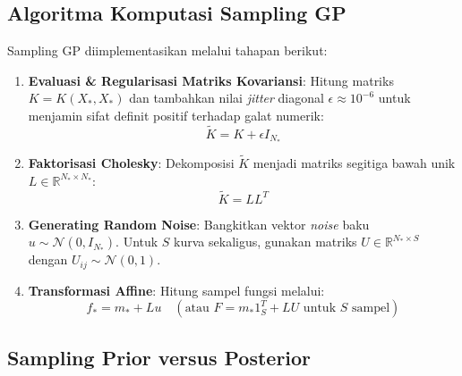 \documentclass[11pt,a4paper]{article}
\def\mathbf#1{#1}%
\begin{document}
\subsection{Algoritma Komputasi Sampling GP}

Sampling GP diimplementasikan melalui tahapan berikut:
\begin{enumerate}
    \item \textbf{Evaluasi \& Regularisasi Matriks Kovariansi}: Hitung matriks $K = K(X_*, X_*)$ dan tambahkan nilai \textit{jitter} diagonal $\epsilon \approx 10^{-6}$ untuk menjamin sifat definit positif terhadap galat numerik:
    \begin{equation}
    \tilde{K} = K + \epsilon I_{N_*}
    \end{equation}
    \item \textbf{Faktorisasi Cholesky}: Dekomposisi $\tilde{K}$ menjadi matriks segitiga bawah unik $L \in \mathbb{R}^{N_* \times N_*}$:
    \begin{equation}
    \tilde{K} = L L^T
    \end{equation}
    \item \textbf{Generating Random Noise}: Bangkitkan vektor \textit{noise} baku $\mathbf{u} \sim \mathcal{N}(\mathbf{0}, I_{N_*})$. Untuk $S$ kurva sekaligus, gunakan matriks $U \in \mathbb{R}^{N_* \times S}$ dengan $U_{ij} \sim \mathcal{N}(0, 1)$.
    \item \textbf{Transformasi Affine}: Hitung sampel fungsi melalui:
    \begin{equation}
    \mathbf{f}_* = \mathbf{m}_* + L \mathbf{u} \quad \left(\text{atau } F = \mathbf{m}_* \mathbf{1}_S^T + L U \text{ untuk } S \text{ sampel}\right)
    \end{equation}
\end{enumerate}

\subsection{Sampling Prior versus Posterior}
\end{document}
